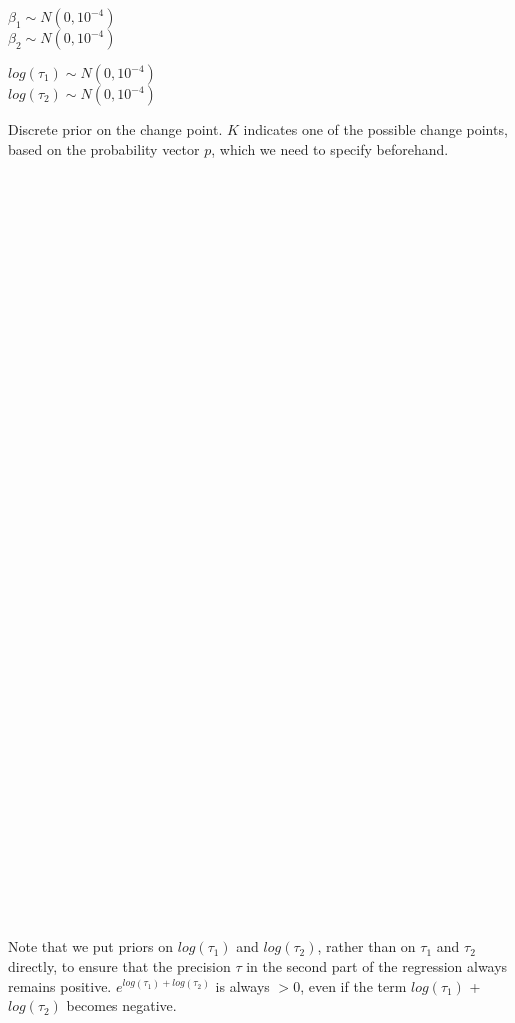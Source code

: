 \documentclass[]{article}
\begin{document}
\(\beta_1 \sim N(0, 10^{-4})\)\\
\(\beta_2 \sim N(0, 10^{-4})\)

\(log(\tau_1) \sim N(0, 10^{-4})\)\\
\(log(\tau_2) \sim N(0, 10^{-4})\)

Discrete prior on the change point. \(K\) indicates one of the possible
change points, based on the probability vector \(p\), which we need to
specify beforehand.

\\

\\
\\
\\
\\
\\
\\
\\
\\
\\
\\
\\
\\
\\
\\
\\
\\
\\
\\
\\
\\
\\
\\
\\
\\
\\
\\
\\
\\
\\
\\
\\
\\
\\
\\
\\
\\
\\
\\

Note that we put priors on \(log(\tau_1)\) and \(log(\tau_2)\), rather
than on \(\tau_1\) and \(\tau_2\) directly, to ensure that the precision
\(\tau\) in the second part of the regression always remains positive.
\(e^{log(\tau_1) + log(\tau_2)}\) is always \(> 0\), even if the term
\(log(\tau_1)\) + \(log(\tau_2)\) becomes negative.
\end{document}
